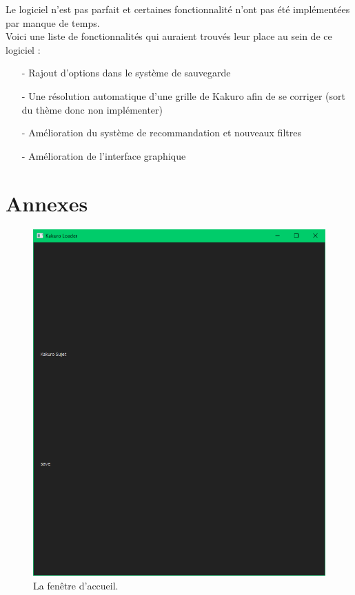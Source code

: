 \documentclass[french,12pt]{article}
\begin{document}
Le logiciel n'est pas parfait et certaines fonctionnalité n'ont pas été implémentées par manque de temps. \\
Voici une liste de fonctionnalités qui auraient trouvés leur place au sein de ce logiciel : \\

\begin{enumerate}
	\item[-] Rajout d'options dans le système de sauvegarde
	\item[-] Une résolution automatique d'une grille de Kakuro afin de se corriger (sort du thème donc non implémenter)
	\item[-] Amélioration du système de recommandation et nouveaux filtres
	\item[-] Amélioration de l'interface graphique
\end{enumerate}

\newpage
\section{Annexes}



\begin{figure}[ht]
  \begin{center}
    \includegraphics[width=\textwidth]{./ressources/acceuil.png} 
  \end{center}
  \caption{La fenêtre d'accueil.}
\end{figure}
\end{document}
